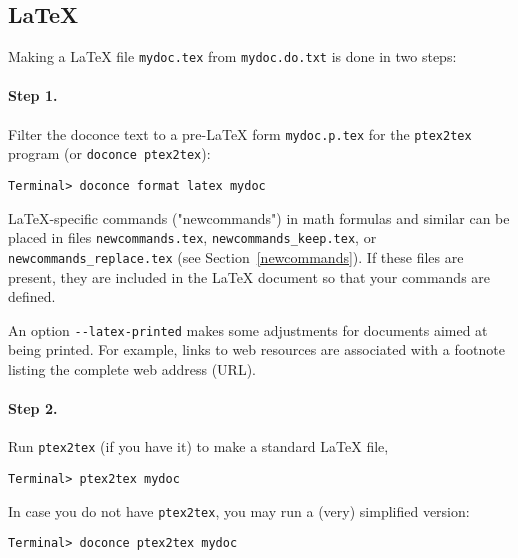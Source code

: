 \documentclass[%
oneside,                 %
final,                   %
10pt]{article}
\begin{document}
{{\subsection{{\LaTeX}}

Making a {\LaTeX} file {\fontsize{10pt}{10pt}\Verb!mydoc.tex!} from {\fontsize{10pt}{10pt}\Verb!mydoc.do.txt!} is done in two steps:

\paragraph{Step 1.}
Filter the doconce text to a pre-LaTeX form {\fontsize{10pt}{10pt}\Verb!mydoc.p.tex!} for
the {\fontsize{10pt}{10pt}\Verb!ptex2tex!} program (or {\fontsize{10pt}{10pt}\Verb!doconce ptex2tex!}):
\vspace{4pt}
\begin{Verbatim}[numbers=none,frame=lines,label=\fbox{{\tiny Terminal}},fontsize=\fontsize{9pt}{9pt},
labelposition=topline,framesep=2.5mm,framerule=0.7pt]
Terminal> doconce format latex mydoc
\end{Verbatim}
LaTeX-specific commands ("newcommands") in math formulas and similar
can be placed in files {\fontsize{10pt}{10pt}\Verb!newcommands.tex!}, {\fontsize{10pt}{10pt}\Verb!newcommands_keep.tex!}, or
{\fontsize{10pt}{10pt}\Verb!newcommands_replace.tex!} (see Section~\ref{newcommands}).
If these files are present, they are included in the {\LaTeX} document
so that your commands are defined.

An option {\fontsize{10pt}{10pt}\Verb!--latex-printed!} makes some adjustments for documents
aimed at being printed. For example, links to web resources are
associated with a footnote listing the complete web address (URL).

\paragraph{Step 2.}
Run {\fontsize{10pt}{10pt}\Verb!ptex2tex!} (if you have it) to make a standard {\LaTeX} file,
\vspace{4pt}
\begin{Verbatim}[numbers=none,frame=lines,label=\fbox{{\tiny Terminal}},fontsize=\fontsize{9pt}{9pt},
labelposition=topline,framesep=2.5mm,framerule=0.7pt]
Terminal> ptex2tex mydoc
\end{Verbatim}
In case you do not have {\fontsize{10pt}{10pt}\Verb!ptex2tex!}, you may run a (very) simplified version:
\vspace{4pt}
\begin{Verbatim}[numbers=none,frame=lines,label=\fbox{{\tiny Terminal}},fontsize=\fontsize{9pt}{9pt},
labelposition=topline,framesep=2.5mm,framerule=0.7pt]
Terminal> doconce ptex2tex mydoc
\end{Verbatim}

}}
\end{document}
